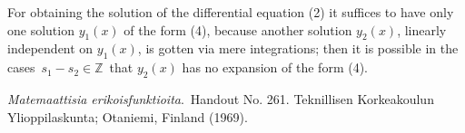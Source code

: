 \documentclass[12pt]{article}
\theoremstyle{definition}
\begin{document}
For obtaining the  solution of the differential equation (2) it suffices to have only one solution $y_1(x)$ of the form (4), because another solution $y_2(x)$, linearly independent on $y_1(x)$, is gotten via mere integrations; then it is possible in the cases\, $s_1\!-\!s_2 \in\mathbb{Z}$\, that $y_2(x)$ has no expansion of the form (4).

\begin{thebibliography}{9}
 {\em Matemaattisia erikoisfunktioita}.\, Handout No. 261. Teknillisen Korkeakoulun Ylioppilaskunta; Otaniemi, Finland (1969).
\end{thebibliography}
\end{document}
